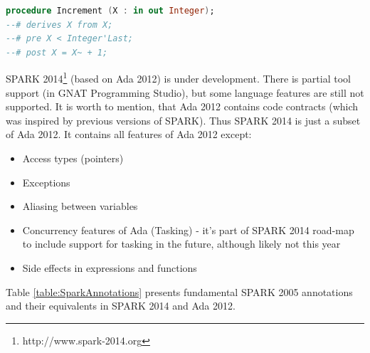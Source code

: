\begin{lstlisting}[language=ada, frame=single, gobble=0, caption={Sample SPARK procedure with code contracts}]
procedure Increment (X : in out Integer);
--# derives X from X;
--# pre X < Integer'Last;
--# post X = X~ + 1;
\end{lstlisting} 
\label{listing:SPARK2005Contracts}

SPARK 2014\footnote{http://www.spark-2014.org} (based on Ada 2012) is under development. There is partial tool support (in GNAT Programming Studio), but some language features are still not supported. It is worth to mention, that Ada 2012 contains code contracts (which was inspired by previous versions of SPARK). Thus SPARK 2014 is just a subset of Ada 2012. \cite{Spark2014:Paper} It contains all features of Ada 2012 except:
\begin{itemize} \itemsep1pt \parskip0pt 
 	\item Access types (pointers)
 	\item Exceptions
	\item Aliasing between variables
	\item Concurrency features of Ada (Tasking) - it's part of SPARK 2014 road-map to include support for tasking in the future, although likely not this year
	\item Side effects in expressions and functions
\end{itemize}

Table \ref{table:SparkAnnotations} presents fundamental SPARK 2005 annotations and their equivalents in SPARK 2014 and Ada 2012.

